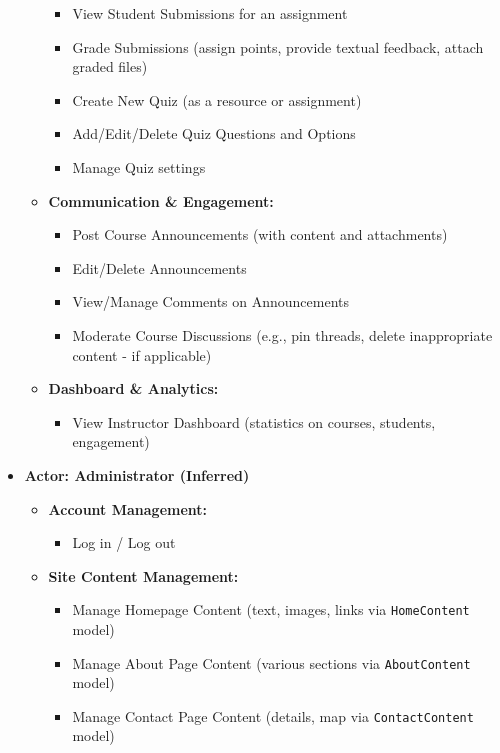 \begin{itemize}
\begin{itemize}
\begin{itemize}
            \item View Student Submissions for an assignment
            \item Grade Submissions (assign points, provide textual feedback, attach graded files)
            \item Create New Quiz (as a resource or assignment)
            \item Add/Edit/Delete Quiz Questions and Options
            \item Manage Quiz settings
        \end{itemize}
        \item \textbf{Communication \& Engagement:}
        \begin{itemize}
            \item Post Course Announcements (with content and attachments)
            \item Edit/Delete Announcements
            \item View/Manage Comments on Announcements
            \item Moderate Course Discussions (e.g., pin threads, delete inappropriate content - if applicable)
        \end{itemize}
        \item \textbf{Dashboard \& Analytics:}
        \begin{itemize}
            \item View Instructor Dashboard (statistics on courses, students, engagement)
        \end{itemize}
    \end{itemize}
    \item \textbf{Actor: Administrator (Inferred)}
    \begin{itemize}
        \item \textbf{Account Management:}
        \begin{itemize}
            \item Log in / Log out
        \end{itemize}
        \item \textbf{Site Content Management:}
        \begin{itemize}
            \item Manage Homepage Content (text, images, links via \texttt{HomeContent} model)
            \item Manage About Page Content (various sections via \texttt{AboutContent} model)
            \item Manage Contact Page Content (details, map via \texttt{ContactContent} model)

\end{itemize}
\end{itemize}
\end{itemize}
